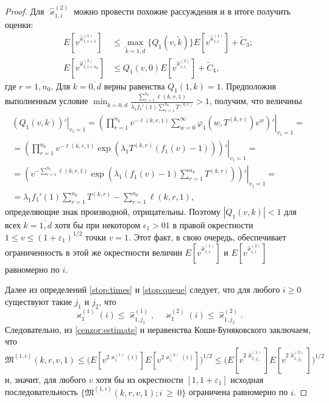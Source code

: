 \begin{proof}
Для $\hat{\varkappa}_{1,i}^{(2)}$ можно провести похожие рассуждения и в итоге получить оценки:
\begin{align}
 E[v^{\hat{\varkappa}_{1,i+1}^{(1)}} ] &\leqslant \max_{ \tilde{k}=\overline{1,d} }{\{Q_1(v,\tilde{k}) \}} E[v^{\hat{\varkappa}_{1,i}^{(1)}} ]+ \widetilde{C}_3;\\
  E[v^{\hat{\varkappa}_{1,i+n_0}^{(2)}}] &\leqslant Q_1(v,0) E[v^{\hat{\varkappa}_{1,i}^{(2)}} ] + \widetilde{C}_4,
  \end{align}
  где $r=\overline{1,n_0}$. Для $k=\overline{0,d}$ верны равенства $Q_1(1,k)=1$. Предположив выполненным условие $\min_{k=\overline{0,d}} { \frac{\sum_{r = 1}^{n_k} \ell(k,r,1) }{\lambda_1 f_1'(1) \sum_{r=1}^{n_k} T^{(k,r)} }}>1$, получим, что величины
\begin{multline}
 \left.\left(Q_1(v,k)\right) ' \right|_{v_1=1} = 
  \left.\left(\prod_{r=1}^{n_k}v^{-\ell(k,r,1)}\sum_{w=0}^{\infty} \varphi_1(w,T^{(k,r)})v^w \right) ' \right|_{v_1=1} = \\ =
   \left.\left(\prod_{r=1}^{n_k} v^{-\ell(k,r,1)}\exp(\lambda_1 T^{(k,r)} (f_1(v)-1))\right) ' \right|_{v_1=1} = \\ =
    \left.\left(v^{-\sum_{r=1}^{n_k}\ell(k,r,1)}\exp(\lambda_1 (f_1(v)-1)\sum_{r=1}^{n_k} T^{(k,r)}) \right) ' \right|_{v_1=1} = \\ =
\lambda_1 f_1'(1) \sum_{r=1}^{n_k} T^{(k,r)} -\sum_{r=1}^{n_k} \ell(k,r,1), 
\label{derivative:cycle:1}
\end{multline}
определяющие знак производной, отрицательны. Поэтому $|Q_1(v,k)|<1$ для всех $k=\overline{1,d}$  хотя бы при некотором $\epsilon_1 > 01$ в  правой окрестности $1 \leqslant v \leqslant (1+ \varepsilon_1)^{1/2}$ точки $v=1$. Этот факт, в свою очередь, обеспечивает ограниченность в этой же окрестности величин $E[v^{\hat{\varkappa}_{1,i}^{(1)}} ]$ и $E[v^{\hat{\varkappa}_{1,i}^{(2)}}] $ равномерно по $i$.


Далее из определений \eqref{stop:times} и \eqref{stop:queue} следует, что для любого $i\geqslant 0$ существуют такие $j_1$ и $j_2$, что
\begin{equation*}
\varkappa_{1}^{(1)}(i) \leqslant \hat{\varkappa}_{1,j_1}^{(1)}, \quad
\varkappa_{1}^{(2)}(i) \leqslant \hat{\varkappa}_{1,j_2}^{(2)}.
\end{equation*}
Следовательно, из \eqref{cenzor:estimate} и неравенства Коши-Буняковского заключаем, что
\begin{equation*}
\mathfrak{M}^{(1,i)}(k,r,v,1) \leqslant \bigl( E[v^{2 \varkappa_{1}^{(1)}(i)}] E[v^{2\varkappa_{1}^{(2)}(i)}]\bigr)^{1/2}
 \leqslant \bigl( E[v^{2 \hat{\varkappa}_{1,j_1}^{(1)}}] E[v^{2\hat{\varkappa}_{1,j_2}^{(2)}}]\bigr)^{1/2}
\end{equation*}
и, значит, для любого $v$ хотя бы из окрестности $[1, 1+\varepsilon_1]$ исходная последовательность $\{\mathfrak{M}^{(1,i)}(k,r,v,1); i~\geqslant~0\}$  ограничена равномерно по $i$.

\end{proof}




